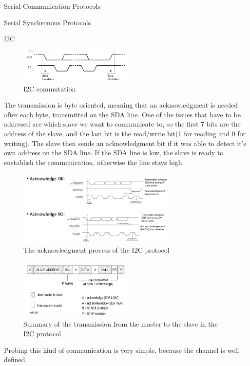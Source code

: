 \begin{section}{Serial Communication Protocols}
\begin{subsection}{Serial Synchronous Protocols}
\begin{subsubsection}{I2C}
      \begin{figure}[H]
        \centering
        \includegraphics[width=0.5\textwidth]{img/hardware/ic2 commutation.png}
        \caption{I2C commutation}
      \end{figure}
      The transmission is byte oriented, meaning that an acknowledgment is needed after each byte,
      transmitted on the SDA line. One of the issues that have to be addresed are which slave we
      want to communicate to, so the first 7 bits are the address of the slave, and the last bit is
      the read/write bit(1 for reading and 0 for writing). The slave then sends an acknowledgment
      bit if it was able to detect it's own address on the SDA line. If the SDA line is low, the
      slave is ready to enstablish the communication, otherwise the line stays high.\\
      \begin{figure}[H]
        \centering
        \includegraphics[width=0.7\textwidth]{img/hardware/ic2 ack.png}
        \caption{The acknowledgment process of the I2C protocol}
      \end{figure}

      \begin{figure}[H]
        \centering
        \includegraphics[width=0.5\textwidth]{img/hardware/i2c summary.png}
        \caption{Summary of the transmission from the master to the slave in the I2C protocol}
      \end{figure}
      Probing this kind of communication is very simple, because the channel is well defined.
    \end{subsubsection}
    

\end{subsection}
\end{section}
